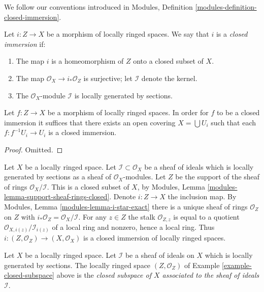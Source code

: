 \noindent
We follow our conventions introduced in
Modules, Definition \ref{modules-definition-closed-immersion}.

\begin{definition}
\label{definition-closed-immersion-locally-ringed-spaces}
Let $i : Z \to X$ be a morphism of locally ringed spaces.
We say that $i$ is a {\it closed immersion} if:
\begin{enumerate}
\item The map $i$ is a homeomorphism of $Z$ onto a closed subset of $X$.
\item The map $\mathcal{O}_X \to i_*\mathcal{O}_Z$ is surjective;
let $\mathcal{I}$ denote the kernel.
\item The $\mathcal{O}_X$-module $\mathcal{I}$
is locally generated by sections.
\end{enumerate}
\end{definition}

\begin{lemma}
\label{lemma-closed-local-target}
Let $f : Z \to X$ be a morphism of locally ringed spaces.
In order for $f$ to be a closed immersion it suffices
that there exists an open covering $X = \bigcup U_i$ such
that each $f : f^{-1}U_i \to U_i$ is a closed immersion.
\end{lemma}

\begin{proof}
Omitted.
\end{proof}

\begin{example}
\label{example-closed-subspace}
Let $X$ be a locally ringed space.
Let $\mathcal{I} \subset \mathcal{O}_X$ be a sheaf
of ideals which is locally generated by sections as a sheaf
of $\mathcal{O}_X$-modules. Let $Z$ be the support of
the sheaf of rings $\mathcal{O}_X/\mathcal{I}$.
This is a closed subset of $X$, by
Modules, Lemma \ref{modules-lemma-support-sheaf-rings-closed}.
Denote $i : Z \to X$ the inclusion map.
By Modules, Lemma \ref{modules-lemma-i-star-exact}
there is a unique sheaf of rings $\mathcal{O}_Z$ on $Z$
with $i_*\mathcal{O}_Z = \mathcal{O}_X/\mathcal{I}$.
For any $z \in Z$ the stalk $\mathcal{O}_{Z, z}$
is equal to a quotient $\mathcal{O}_{X, i(z)}/\mathcal{I}_{i(z)}$
of a local ring and nonzero, hence a local ring.
Thus $i : (Z, \mathcal{O}_Z) \to (X, \mathcal{O}_X)$ is
a closed immersion of locally ringed spaces.
\end{example}

\begin{definition}
\label{definition-closed-subspace}
Let $X$ be a locally ringed space.
Let $\mathcal{I}$ be a sheaf of ideals on $X$
which is locally generated by sections.
The locally ringed space $(Z, \mathcal{O}_Z)$
of Example \ref{example-closed-subspace} above
is the {\it closed subspace of $X$ associated to
the sheaf of ideals $\mathcal{I}$}.
\end{definition}

